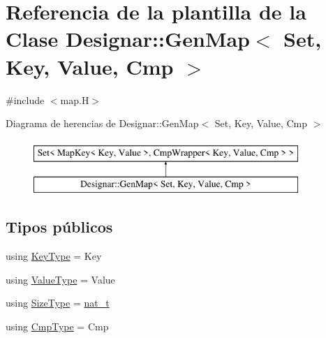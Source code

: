 \hypertarget{class_designar_1_1_gen_map}{}\section{Referencia de la plantilla de la Clase Designar\+:\+:Gen\+Map$<$ Set, Key, Value, Cmp $>$}
\label{class_designar_1_1_gen_map}


{\ttfamily \#include $<$map.\+H$>$}

Diagrama de herencias de Designar\+:\+:Gen\+Map$<$ Set, Key, Value, Cmp $>$\begin{figure}[H]
\begin{center}
\leavevmode
\includegraphics[height=2.000000cm]{class_designar_1_1_gen_map}
\end{center}
\end{figure}
\subsection*{Tipos públicos}
\begin{DoxyCompactItemize}
\item 
using \hyperlink{class_designar_1_1_gen_map_aeb697a86f4ad13eadc36bf5cc967f26f}{Key\+Type} = Key
\item 
using \hyperlink{class_designar_1_1_gen_map_a525bf32010df09e293fa7a0db5a2a8ef}{Value\+Type} = Value
\item 
using \hyperlink{class_designar_1_1_gen_map_ad7fadcebeec688bb447f63c4bfabc61c}{Size\+Type} = \hyperlink{namespace_designar_aa72662848b9f4815e7bf31a7cf3e33d1}{nat\+\_\+t}
\item 
using \hyperlink{class_designar_1_1_gen_map_ac80521be38e4e808bcbeb7041da7d813}{Cmp\+Type} = Cmp
\end{DoxyCompactItemize}
